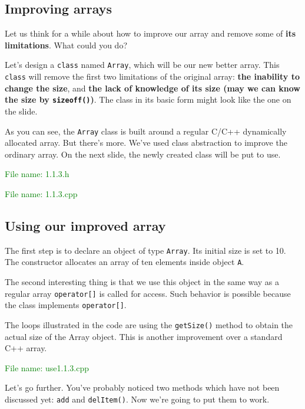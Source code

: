 \subsection{Improving arrays} %

Let us think for a while about how to improve our array and remove some of \textbf{its limitations}.
What could you do?

Let’s design a \texttt{class} named \texttt{Array}, which will be our new better array. 
This \texttt{class} will remove the first two limitations of the original array: 
\textbf{the inability to change the size}, and \textbf{the lack of knowledge of its 
size (may we can know the size by \texttt{sizeoff()})}. The class in its basic form 
might look like the one on the slide.

As you can see, the \texttt{Array} class is built around a regular C/C++ dynamically 
allocated array. But there’s more. We’ve used class abstraction to improve the ordinary array.
On the next slide, the newly created class will be put to use.

\textcolor{green}{File name: 1.1.3.h}


\textcolor{green}{File name: 1.1.3.cpp}


\subsection{Using our improved array} %
The first step is to declare an object of type \texttt{Array}.
Its initial size is set to 10. The constructor allocates an array of ten elements 
inside object \texttt{A}.

The second interesting thing is that we use this object in the same way as a 
regular array \texttt{operator[]} is called for access. Such behavior is possible 
because the class implements \texttt{operator[]}.

The loops illustrated in the code are using the \texttt{getSize()} method to obtain 
the actual size of the Array object. This is another improvement over a standard C++ array.

\textcolor{green}{File name: use1.1.3.cpp}


Let’s go further. You’ve probably noticed two methods which have not been discussed yet: 
\texttt{add} and \texttt{delItem()}. Now we’re going to put them to work. 

